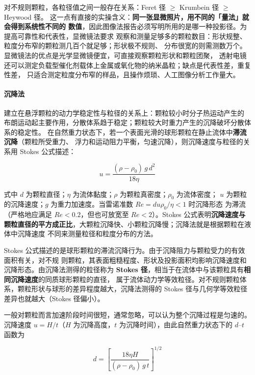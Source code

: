 对不规则颗粒，各粒径值之间一般存在关系：Feret 径 $\geq$ Krumbein 径 $\geq$ Heywood 径。
这一点有直接的实操含义：\textbf{同一张显微照片，用不同的「量法」就会得到系统性不同的
数值}，因此图像法报告必须写明所用的是哪一种投影径。为提高可靠性和代表性，显微镜法要求
观察和测量足够多的颗粒数目：形状规整、粒度分布窄的颗粒测几百个就足够；形状极不规则、
分布很宽的则需测数万个。显微镜法的优点是光学显微镜便宜，可直接观察颗粒形状和颗粒团聚，
透射电镜还可以测定负载型催化剂载体上金属或氧化物的纳米晶粒；缺点是代表性差，重复性差，
只适合测定粒度分布窄的样品，且操作烦琐、人工图像分析工作量大。

\paragraph{沉降法}建立在悬浮颗粒的动力学稳定性与粒径的关系上：颗粒较小时分子热运动产生的
布朗运动起主要作用，分散体系趋于稳定；颗粒较大时重力产生的沉降破坏分散体系的稳定性。
在自然重力状态下，若一个表面光滑的球形颗粒在静止流体中\textbf{滞流沉降}（颗粒所受重力、
浮力和运动阻力平衡，匀速沉降），则沉降速度与粒径的关系用 Stokes 公式描述：

\begin{equation}\label{eq:ch01c-stokes}
u=\frac{(\rho-\rho_{0})\,g\,d^{2}}{18\eta}
\end{equation}

式中 $d$ 为颗粒直径；$\eta$ 为流体黏度；$\rho$ 为颗粒真密度；$\rho_0$ 为流体密度；
$u$ 为颗粒的沉降速度；$g$ 为重力加速度。当雷诺准数 $Re=d u \rho_{0}/\eta<1$ 时沉降形态
为滞流（严格地应满足 $Re<0.2$，但也可放宽至 $Re<2$）。Stokes 公式表明\textbf{沉降速度与
颗粒直径的平方成正比}，大颗粒沉降快、小颗粒沉降慢；沉降法就是根据颗粒在液体中沉降速度
不同来测量粒径和粒度分布的方法。

Stokes 公式描述的是球形颗粒的滞流沉降行为。由于沉降阻力与颗粒受力的有效面积有关，对不规
则颗粒，其表面粗糙程度、形状及投影面积均影响沉降速度和沉降形态。由沉降法测得的粒径称为
\textbf{Stokes 径}，相当于在流体中与该颗粒具有\textbf{相同沉降速度}的同质球形颗粒的直径，
属于流体动力学等效粒径。对不规则颗粒体系，颗粒形状与球形的差异程度越大，沉降法测得的
Stokes 径与几何学等效粒径差异也就越大（Stokes 径偏小）。

一般对颗粒而言加速阶段时间很短，通常忽略，可以认为整个沉降过程是匀速的。沉降速度
$u=H/t$（$H$ 为沉降高度，$t$ 为沉降时间），由此自然重力状态下的 $d$--$t$ 函数为

\begin{equation}\label{eq:ch01c-dt-g}
d=\left[\frac{18\eta H}{(\rho-\rho_{0})\,g\,t}\right]^{1/2}
\end{equation}

